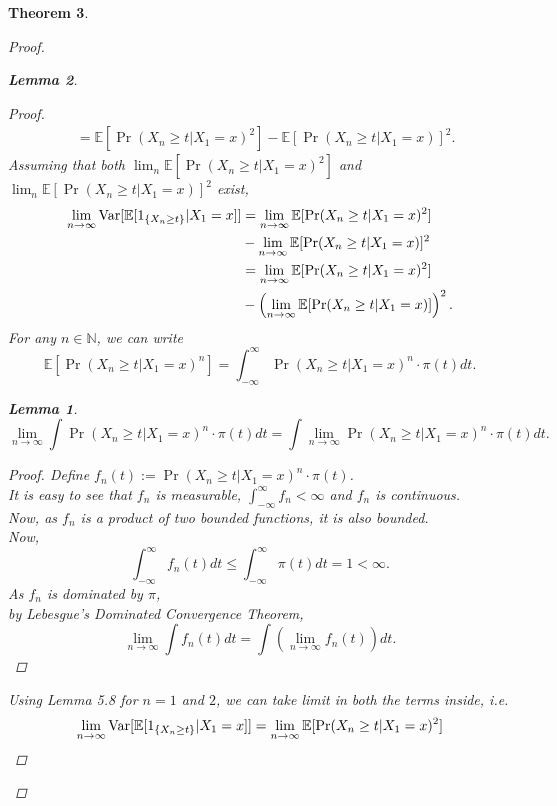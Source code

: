 \documentclass{article}
\newtheorem{theorem}{Theorem}[section]
\newtheorem{lemma}[theorem]{Lemma}
\begin{document}
\begin{theorem}
\begin{proof}
\begin{lemma}
\begin{proof}
\begin{align*}
						&= \mathbb{E}[\Pr(X_{n} \geq t | X_{1} = x)^2] - \mathbb{E}[\Pr(X_{n} \geq t | X_{1} = x)]^2.
					\end{align*}
					Assuming that both $\lim_n \mathbb{E}[\Pr(X_{n} \geq t | X_{1} = x)^2]$ and  $\lim_n \mathbb{E}[\Pr(X_{n} \geq t | X_{1} = x)]^2$ exist,
					\begin{align*}
						\lim_{n \rightarrow \infty} \text{Var}[\mathbb{E}[1_{\{X_{n} \geq t\}}|X_1=x]] &= \lim_{n \rightarrow \infty} \mathbb{E}[\Pr(X_{n} \geq t | X_{1} = x)^2]\\
						&- \lim_{n \rightarrow \infty} \mathbb{E}[\Pr(X_{n} \geq t | X_{1} = x)]^2\\
						&= \lim_{n \rightarrow \infty} \mathbb{E}[\Pr(X_{n} \geq t | X_{1} = x)^2]\\
						&- \left(\lim_{n \rightarrow \infty} \mathbb{E}[\Pr(X_{n} \geq t | X_{1} = x)]\right)^2.\\
					\end{align*}
					For any $n \in \mathbb{N}$, we can write
					$$\mathbb{E}[\Pr(X_{n} \geq t | X_{1} = x)^n] = \int_{-\infty}^{\infty} \Pr(X_{n} \geq t | X_{1} = x)^n \cdot \pi(t)dt.$$
					\begin{lemma}
						$$\lim_{n \rightarrow \infty} \int \Pr(X_{n} \geq t | X_{1} = x)^n \cdot \pi(t) dt = \int \lim_{n \rightarrow \infty}\Pr(X_{n} \geq t | X_{1} = x)^n \cdot \pi(t)dt.$$
						\begin{proof}
							Define $f_n(t) := \Pr(X_{n} \geq t | X_{1} = x)^n \cdot \pi(t)$. \\
							It is easy to see that $f_n$ is measurable, $\int_{-\infty}^{\infty} f_n < \infty$ and $f_n$ is continuous.\\
							Now, as $f_n$ is a product of two bounded functions, it is also bounded. \\
							Now,
							$$\int_{-\infty}^{\infty} f_n(t)dt \leq \int_{-\infty}^{\infty} \pi(t)dt = 1 < \infty.$$
							As $f_n$ is dominated by $\pi$, \\
							by Lebesgue's Dominated Convergence Theorem,
							$$\lim_{n \rightarrow \infty} \int f_n(t) dt = \int \left(\lim_{n \rightarrow \infty} f_n(t)\right) dt.$$
						\end{proof}
					\end{lemma}
					Using Lemma 5.8 for $n = 1$ and $2$, we can take limit in both the terms inside, i.e.
					\begin{align*}
						\lim_{n \rightarrow \infty} \Var[\mathbb{E}[1_{\{X_{n} \geq t\}}|X_1=x]] &= \lim_{n \rightarrow \infty} \mathbb{E}[\Pr(X_{n} \geq t | X_{1} = x)^2]\\

\end{align*}
\end{proof}
\end{lemma}
\end{proof}
\end{theorem}
\end{document}

